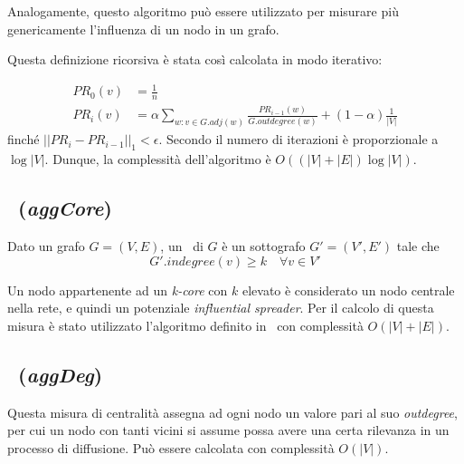 Analogamente, questo algoritmo può essere utilizzato per misurare più genericamente l'influenza di un nodo 
in un grafo.

Questa definizione ricorsiva è stata così calcolata in modo iterativo: 

\begin{equation}
    \begin{split}
PR_0(v)&= \frac{1}{n}\\
PR_i(v)&= \alpha \sum_{w : v \in G.adj(w)} 
\frac{PR_{i-1}(w)}{G.outdegree(w)} + 
(1-\alpha)\frac{1}{|V|}
    \end{split}
\end{equation}
finché $||PR_{i} - PR_{i-1}||_1 < \epsilon$. Secondo \cite{page:pagerank} il numero di iterazioni 
è proporzionale a $\log{|V|}$. Dunque, la complessità dell'algoritmo è $O((|V| + |E|)\log{|V|})$.


\subsection{\kcore~(\textit{aggCore})}
\begin{definizione}[\kcore]
    \label{def:kcore}
    Dato un grafo $G=(V, E)$, un \kcore\ di $G$ è un sottografo $G'=(V',E')$
    tale che 
    \begin{equation}
        G'.indegree(v) \geq k \quad \forall v \in V'
    \end{equation}
\end{definizione}

Un nodo appartenente ad un \textit{k-core} con $k$ elevato è considerato un nodo centrale 
nella rete, e quindi un potenziale \textit{influential spreader}.
Per il calcolo di questa misura è stato utilizzato l'algoritmo definito in~\cite{batagelj:kcore}
con complessità $O(|V| + |E|)$.

\subsection{\degree~(\textit{aggDeg})}
Questa misura di centralità assegna ad ogni nodo un valore pari al suo \textit{outdegree}, 
per cui un nodo con tanti vicini si assume possa avere una certa rilevanza in un 
processo di diffusione.
Può essere calcolata con complessità $O(|V|)$.

